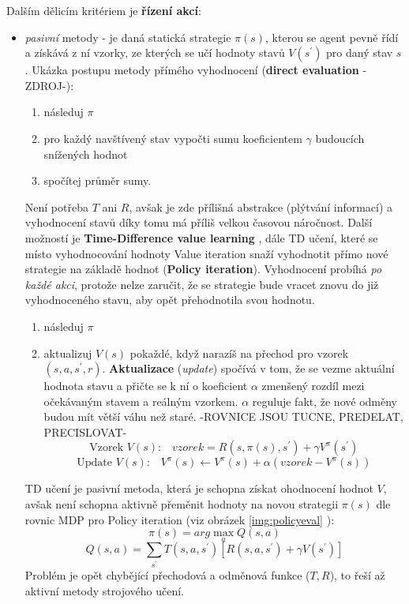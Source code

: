 Dalším dělicím kritériem je \textbf{řízení akcí}:
\begin{itemize}
\item \textit{pasivní} metody - je daná statická strategie $\pi(s)$, kterou se agent pevně řídí a získává z ní vzorky, ze kterých se učí hodnoty stavů $V(s^\prime)$ pro daný stav $s$.
\newline
Ukázka postupu metody přímého vyhodnocení (\textbf{direct evaluation} -ZDROJ-):
\begin{enumerate}
\item následuj $\pi$
\item pro každý navštívený stav vypočti sumu koeficientem $\gamma$ budoucích snížených hodnot
\item spočítej průměr sumy.
\end{enumerate}
Není potřeba $T$ ani $R$, avšak je zde přílišná abstrakce (plýtvání informací) a vyhodnocení stavů díky tomu má příliš velkou časovou náročnost.
\newline
Další možností je \textbf{Time-Difference value learning} \cite{RLIntro}, dále TD učení, které se místo vyhodnocování hodnoty Value iteration snaží vyhodnotit přímo nové strategie na základě hodnot (\textbf{Policy iteration}). Vyhodnocení probíhá \textit{po každé akci}, protože nelze zaručit, že se strategie bude vracet znovu do již vyhodnoceného stavu, aby opět přehodnotila svou hodnotu.
\begin{enumerate}
\item následuj $\pi$
\item aktualizuj $V(s)$ pokaždé, když narazíš na přechod pro vzorek $(s,a,s^\prime,r)$. \textbf{Aktualizace} (\textit{update}) spočívá v tom, že se vezme aktuální hodnota stavu a přičte se k ní o koeficient $\alpha$ zmenšený rozdíl mezi očekávaným stavem a reálným vzorkem. $\alpha$ reguluje fakt, že nové odměny budou mít větší váhu než staré.
-ROVNICE JSOU TUCNE, PREDELAT, PRECISLOVAT-  
\begin{displaymath}
\textrm{Vzorek $V(s)$:}\quad vzorek = R(s,\pi(s),s^\prime)+\gamma V^\pi(s^\prime)
\end{displaymath}
\begin{displaymath}
\textrm{Update $V(s)$:} \quad V^\pi(s) \leftarrow  V^\pi(s) + \alpha(vzorek - V^\pi(s))
\end{displaymath}
\end{enumerate}
TD učení je pasivní metoda, která je schopna získat ohodnocení hodnot $V$, avšak není schopna aktivně přeměnit hodnoty na novou strategii $\pi(s)$ dle rovnic MDP pro Policy iteration (viz obrázek \ref{img:policyeval} \cite{berkeley}):
\begin{displaymath}
\pi(s) = arg \max_a Q(s,a)
\end{displaymath}
\begin{displaymath}
Q(s,a) = \sum_{s^\prime}T(s,a,s^\prime) \left[R(s,a,s^\prime)+\gamma V(s^\prime) \right]
\end{displaymath}
Problém je opět chybějící přechodová a odměnová funkce ($T,R$), to řeší až aktivní metody strojového učení.


\end{itemize}
